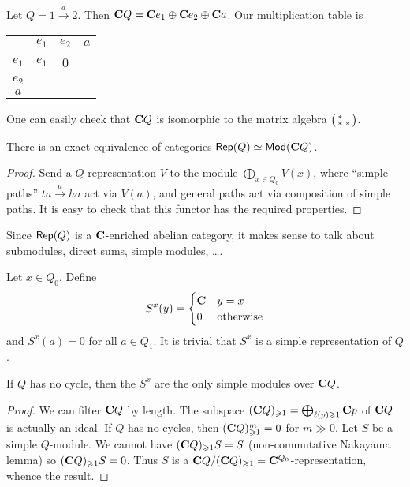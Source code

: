 \documentclass{article}
\begin{document}
\begin{example}
Let $Q=1\xrightarrow a 2$. Then $\mathbf{C} Q = \mathbf{C} e_1 \oplus \mathbf{C} e_2 \oplus \mathbf{C} a$. 
Our multiplication table is 
\begin{center}
\begin{tabular}{c|ccc}
        & $e_1$ & $e_2$ & $a$ \\ \hline
  $e_1$ & $e_1$ & 0 \\
  $e_2$ \\
  $a$
\end{tabular}
\end{center}
One can easily check that $\mathbf{C} Q$ is isomorphic to the matrix algebra 
$\bigl(\begin{smallmatrix} \ast &  \\ \ast & \ast \end{smallmatrix} \bigr)$. 
\end{example}

\begin{proposition}
There is an exact equivalence of categories 
$\operatorname{\mathsf{Rep}}(Q) \simeq \operatorname{\mathsf{Mod}}(\mathbf{C} Q)$. 
\end{proposition}
\begin{proof}
Send a $Q$-representation $V$ to the module $\bigoplus_{x\in Q_0} V(x)$, where 
``simple paths'' $t a \xrightarrow a h a$ act via $V(a)$, and general paths act 
via composition of simple paths. It is easy to check that this functor has the 
required properties. 
\end{proof}



Since $\operatorname{\mathsf{Rep}}(Q)$ is a $\mathbf{C}$-enriched abelian category, it makes 
sense to talk about submodules, direct sums, simple modules, \ldots. 

\begin{example}
Let $x\in Q_0$. Define 
\[
  S^x(y) = \begin{cases} \mathbf{C} & y=x \\ 0 & \text{otherwise} \end{cases} 
\]
and $S^x(a) = 0$ for all $a\in Q_1$. It is trivial that $S^x$ is a simple 
representation of $Q$. 
\end{example}

\begin{proposition}
If $Q$ has no cycle, then the $S^x$ are the only simple modules over $\mathbf{C} Q$. 
\end{proposition}
\begin{proof}
We can filter $\mathbf{C} Q$ by length. The subspace 
$(\mathbf{C} Q)_{\geqslant 1} = \bigoplus_{\ell(p)\geqslant 1} \mathbf{C} p$ of 
$\mathbf{C} Q$ is actually an ideal. If $Q$ has no cycles, then 
$(\mathbf{C} Q)_{\geqslant 1}^m = 0$ for $m\gg 0$. Let $S$ be a simple $Q$-module.
We cannot have $(\mathbf{C} Q)_{\geqslant 1} S=S$ (non-commutative Nakayama 
lemma) so $(\mathbf{C} Q)_{\geqslant 1} S = 0$. Thus $S$ is a 
$\mathbf{C} Q/(\mathbf{C} Q)_{\geqslant 1}=\mathbf{C}^{Q_0}$-representation, whence the result.  
\end{proof}
\end{document}
